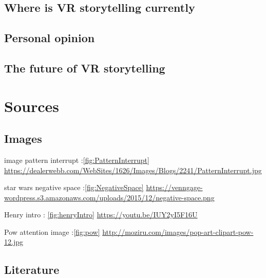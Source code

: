 \documentclass{report}
\begin{document}
				\section{Where is VR storytelling currently}
				
				\section{Personal opinion}
				
				\section{The future of VR storytelling}
				
				\chapter{Sources}
				
				\section{Images}
				
				
				image pattern interrupt :\ref{fig:PatternInterrupt} \href{https://dealerwebb.com/WebSites/1626/Images/Blogs/2241/PatternInterrupt.jpg}{https://dealerwebb.com/WebSites/1626/Images/Blogs/2241/PatternInterrupt.jpg}
				
				star wars negative space :\ref{fig:NegativeSpace} \href{https://venngage-wordpress.s3.amazonaws.com/uploads/2015/12/negative-space.png}{https://venngage-wordpress.s3.amazonaws.com/uploads/2015/12/negative-space.png}
				
				Henry intro : \ref{fig:henryIntro} \href{https://youtu.be/IUY2yI5F16U}{https://youtu.be/IUY2yI5F16U}
				
				Pow attention image :\ref{fig:pow}
				\href{http://moziru.com/images/pop-art-clipart-pow-12.jpg}{http://moziru.com/images/pop-art-clipart-pow-12.jpg}
				
				\section{Literature}
				
				
				
		
\end{document}

